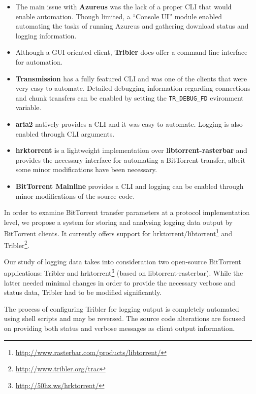 \begin{itemize}

  \item The main issue with \textbf{Azureus} was the lack of a proper CLI that
  would enable automation. Though limited, a ``Console UI'' module enabled
  automating the tasks of running Azureus and gathering download status and
  logging information.

  \item Although a GUI oriented client, \textbf{Tribler} does offer a command
  line interface for automation.

  \item \textbf{Transmission} has a fully featured CLI and was one of the
  clients that were very easy to automate. Detailed debugging information
  regarding connections and chunk transfers can be enabled by setting the
  \texttt{TR\_DEBUG\_FD} evironment variable.

  \item \textbf{aria2} natively provides a CLI and it was easy to automate.
  Logging is also enabled through CLI arguments.

  \item \textbf{hrktorrent} is a lightweight implementation over
  \textbf{libtorrent-rasterbar} and provides the necessary interface for
  automating a BitTorrent transfer, albeit some minor modifications have been
  necessary.

  \item \textbf{BitTorrent Mainline} provides a CLI and logging can be enabled
  through minor modifications of the source code.

\end{itemize}


In order to examine BitTorrent transfer parameters at a protocol
implementation level, we propose a system for storing and analysing logging
data output by BitTorrent clients. It currently offers support for
hrktorrent/libtorrent\footnote{\url{http://www.rasterbar.com/products/libtorrent/}}
and Tribler\footnote{\url{http://www.tribler.org/trac}}.

Our study of logging data takes into consideration two open-source BitTorrent
applications: Tribler and hrktorrent\footnote{\url{http://50hz.ws/hrktorrent/}}
(based on libtorrent-rasterbar). While the latter needed minimal changes in
order to provide the necessary verbose and status data, Tribler had to be
modified significantly.

The process of configuring Tribler for logging output is completely automated
using shell scripts and may be reversed. The source code alterations are
focused on providing both status and verbose messages as client output
information.

